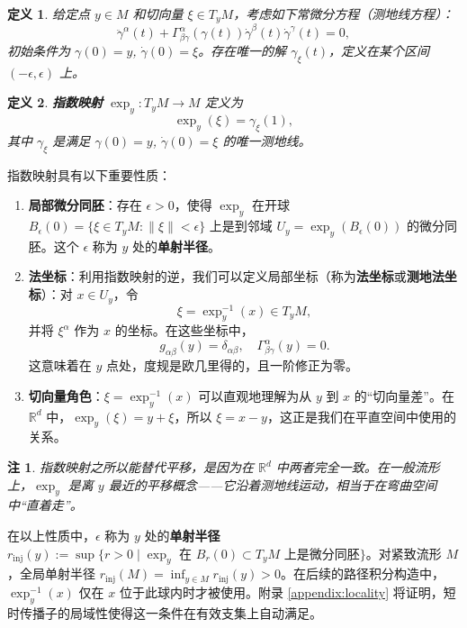 \documentclass{book}
\newcommand{\assign}{:=}
\newtheorem{definition}{定义}[chapter]
\newtheorem{remark}{注}[chapter]
\begin{document}
\begin{definition}
  给定点 $y \in M$ 和切向量 $\xi \in T_yM$，考虑如下常微分方程（测地线方程）：
  \[
  \ddot{\gamma}^\alpha(t) + \Gamma^\alpha_{\beta\gamma}(\gamma(t)) \dot{\gamma}^\beta(t) \dot{\gamma}^\gamma(t) = 0,
  \]
  初始条件为 $\gamma(0) = y$, $\dot{\gamma}(0) = \xi$。存在唯一的解 $\gamma_\xi(t)$，定义在某个区间 $(-\epsilon, \epsilon)$ 上。
\end{definition}

\begin{definition}
  \textbf{指数映射} $\exp_y: T_yM \to M$ 定义为
  \[
  \exp_y(\xi) = \gamma_\xi(1),
  \]
  其中 $\gamma_\xi$ 是满足 $\gamma(0)=y$, $\dot{\gamma}(0)=\xi$ 的唯一测地线。
\end{definition}

指数映射具有以下重要性质：

\begin{enumerate}
  \item \textbf{局部微分同胚}：存在 $\epsilon > 0$，使得 $\exp_y$ 在开球 $B_\epsilon(0) = \{ \xi \in T_yM : \|\xi\| < \epsilon \}$ 上是到邻域 $U_y = \exp_y(B_\epsilon(0))$ 的微分同胚。这个 $\epsilon$ 称为 $y$ 处的\textbf{单射半径}。
  
  \item \textbf{法坐标}：利用指数映射的逆，我们可以定义局部坐标（称为\textbf{法坐标}或\textbf{测地法坐标}）：对 $x \in U_y$，令
    \[
    \xi = \exp_y^{-1}(x) \in T_yM,
    \]
    并将 $\xi^\alpha$ 作为 $x$ 的坐标。在这些坐标中，
    \[
    g_{\alpha\beta}(y) = \delta_{\alpha\beta}, \quad \Gamma^\alpha_{\beta\gamma}(y) = 0.
    \]
    这意味着在 $y$ 点处，度规是欧几里得的，且一阶修正为零。
  
  \item \textbf{切向量角色}：$\xi = \exp_y^{-1}(x)$ 可以直观地理解为从 $y$ 到 $x$ 的“切向量差”。在 $\mathbb{R}^d$ 中，$\exp_y(\xi) = y + \xi$，所以 $\xi = x - y$，这正是我们在平直空间中使用的关系。
\end{enumerate}

\begin{remark}
  指数映射之所以能替代平移，是因为在 $\mathbb{R}^d$ 中两者完全一致。在一般流形上，$\exp_y$ 是离 $y$ 最近的平移概念——它沿着测地线运动，相当于在弯曲空间中“直着走”。
\end{remark}

在以上性质中，$\epsilon$ 称为 $y$ 处的\textbf{单射半径} $r_{\mathrm{inj}}(y) \assign \sup\{ r > 0 \mid \exp_y \text{ 在 } B_r(0) \subset T_yM \text{ 上是微分同胚} \}$。对紧致流形 $M$，全局单射半径 $r_{\mathrm{inj}}(M) = \inf_{y\in M} r_{\mathrm{inj}}(y) > 0$。在后续的路径积分构造中，$\exp_y^{-1}(x)$ 仅在 $x$ 位于此球内时才被使用。附录 \ref{appendix:locality} 将证明，短时传播子的局域性使得这一条件在有效支集上自动满足。
\end{document}

